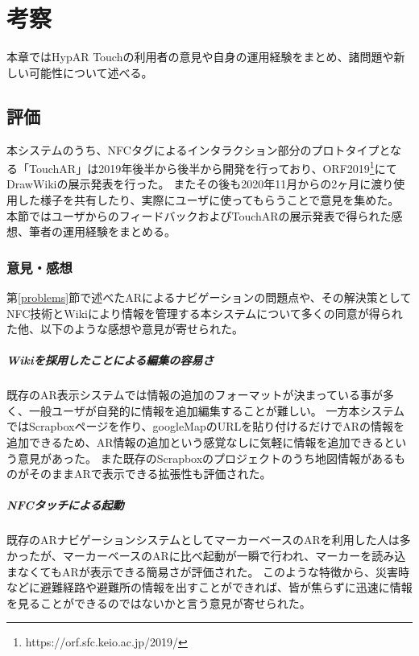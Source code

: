 \chapter{考察}
\label{chap:consideration}

本章ではHypAR Touchの利用者の意見や自身の運用経験をまとめ、諸問題や新しい可能性について述べる。

\newpage


\section{評価}
本システムのうち、NFCタグによるインタラクション部分のプロトタイプとなる「TouchAR」は2019年後半から後半から開発を行っており、ORF2019\footnote{ \textsf{https://orf.sfc.keio.ac.jp/2019/} }にてDrawWikiの展示発表を行った。
またその後も2020年11月からの2ヶ月に渡り使用した様子を共有したり、実際にユーザに使ってもらうことで意見を集めた。
本節ではユーザからのフィードバックおよびTouchARの展示発表で得られた感想、筆者の運用経験をまとめる。

\subsection{意見・感想}

第\ref{problems}節で述べたARによるナビゲーションの問題点や、その解決策としてNFC技術とWikiにより情報を管理する本システムについて多くの同意が得られた他、以下のような感想や意見が寄せられた。

\paragraph*{Wikiを採用したことによる編集の容易さ}
既存のAR表示システムでは情報の追加のフォーマットが決まっている事が多く、一般ユーザが自発的に情報を追加編集することが難しい。
一方本システムではScrapboxページを作り、googleMapのURLを貼り付けるだけでARの情報を追加できるため、AR情報の追加という感覚なしに気軽に情報を追加できるという意見があった。
また既存のScrapboxのプロジェクトのうち地図情報があるものがそのままARで表示できる拡張性も評価された。

\paragraph*{NFCタッチによる起動}
既存のARナビゲーションシステムとしてマーカーベースのARを利用した人は多かったが、マーカーベースのARに比べ起動が一瞬で行われ、マーカーを読み込まなくてもARが表示できる簡易さが評価された。
このような特徴から、災害時などに避難経路や避難所の情報を出すことができれば、皆が焦らずに迅速に情報を見ることができるのではないかと言う意見が寄せられた。


